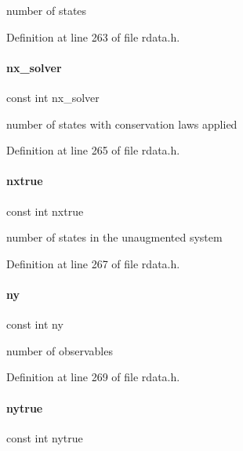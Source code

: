 number of states 

Definition at line 263 of file rdata.\+h.

\mbox{\label{classamici_1_1_return_data_a3a6f34c755e990967cc756b92f406373}} 
\paragraph{\texorpdfstring{nx\_solver}{nx\_solver}}
{\footnotesize\ttfamily const int nx\+\_\+solver}

number of states with conservation laws applied 

Definition at line 265 of file rdata.\+h.

\mbox{\label{classamici_1_1_return_data_acf5766cc8560edbdcec5b8ef79459239}} 
\paragraph{\texorpdfstring{nxtrue}{nxtrue}}
{\footnotesize\ttfamily const int nxtrue}

number of states in the unaugmented system 

Definition at line 267 of file rdata.\+h.

\mbox{\label{classamici_1_1_return_data_a811734e12750524808dba01c57e92c66}} 
\paragraph{\texorpdfstring{ny}{ny}}
{\footnotesize\ttfamily const int ny}

number of observables 

Definition at line 269 of file rdata.\+h.

\mbox{\label{classamici_1_1_return_data_a54bcfe56ad0df183516d096adf4e0b26}} 
\paragraph{\texorpdfstring{nytrue}{nytrue}}
{\footnotesize\ttfamily const int nytrue}

